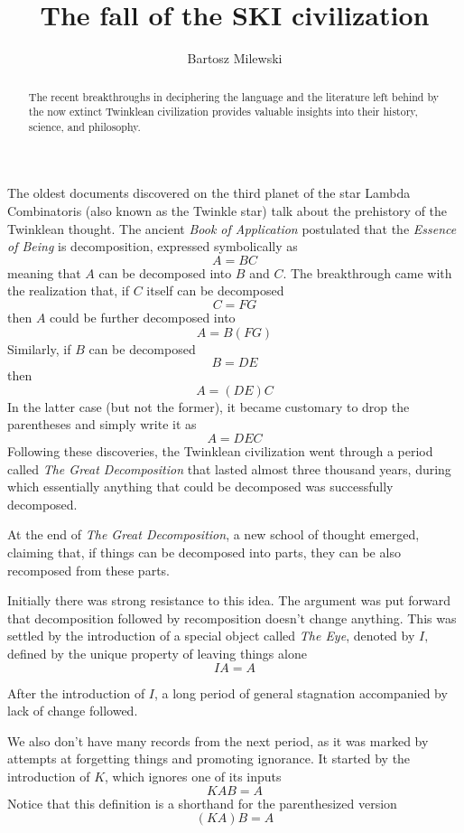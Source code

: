 \documentclass[11pt]{amsart}
\author{Bartosz Milewski}
\title{The fall of the SKI civilization}
\begin{document}
\maketitle{}

\begin{abstract}
The recent breakthroughs in deciphering the language and the literature left behind by the now extinct Twinklean civilization provides valuable insights into their history, science, and philosophy. 
\end{abstract}

The oldest documents discovered on the third planet of the star Lambda Combinatoris (also known as the Twinkle star) talk about the prehistory of the Twinklean thought. The ancient \emph{Book of Application} postulated that the \emph{Essence of Being} is decomposition, expressed symbolically as 
 \[ A = B C\]
meaning that $A$ can be decomposed into $B$ and $C$. The breakthrough came with the realization that, if $C$ itself can be decomposed
 \[ C = F G\]
then $A$ could be further decomposed into
 \[ A = B (F G)\]
Similarly, if $B$ can be decomposed
 \[ B = D E\]
then 
 \[ A = (D E) C\]
In the latter case (but not the former), it became customary to drop the parentheses and simply write it as
 \[ A = D E C\]
Following these discoveries, the Twinklean civilization went through a period called \emph{The Great Decomposition} that lasted almost three thousand years, during which essentially anything that could be decomposed was successfully decomposed.

At the end of \emph{The Great Decomposition}, a new school of thought emerged, claiming that, if things can be decomposed into parts, they can be also recomposed from these parts. 

Initially there was strong resistance to this idea. The argument was put forward that decomposition followed by recomposition doesn't change anything. This was settled by the introduction of a special object called \emph{The Eye}, denoted by $I,$ defined by the unique property of leaving things alone
 \[ I A = A\]

After the introduction of $I$, a long period of general stagnation accompanied by lack of change followed.

We also don't have many records from the next period, as it was marked by attempts at forgetting things and promoting ignorance. It started by the introduction of $K$, which ignores one of its inputs
 \[ K A B = A\]
Notice that this definition is a shorthand for the parenthesized version
 \[ (K A) B = A\]
\end{document}
